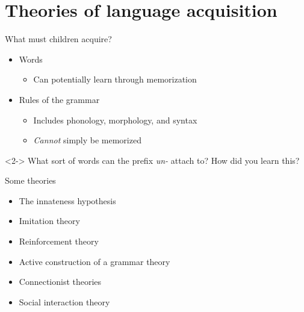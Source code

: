 \documentclass{beamer}
\begin{document}
    \section{Theories of language acquisition}
        \begin{frame}{What must children acquire?}
            \begin{itemize}
                \item Words
                    \begin{itemize}
                        \item Can potentially learn through memorization
                    \end{itemize}
                \item Rules of the grammar
                    \begin{itemize}
                        \item Includes phonology, morphology, and syntax
                        \item \emph{Cannot} simply be memorized
                    \end{itemize}
            \end{itemize}
            \begin{example}<2->
                What sort of words can the prefix \emph{un-} attach to? How did you learn this?
            \end{example}
        \end{frame}
        \begin{frame}{Some theories}
            \begin{itemize}
                \item \alert<2->{The innateness hypothesis}
                \item Imitation theory
                \item Reinforcement theory
                \item Active construction of a grammar theory
                \item Connectionist theories
                \item Social interaction theory
            \end{itemize}
        \end{frame}
\end{document}
